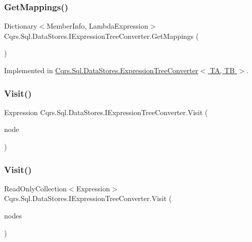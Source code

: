 \subsubsection{\texorpdfstring{Get\+Mappings()}{GetMappings()}}
{\footnotesize\ttfamily Dictionary$<$Member\+Info, Lambda\+Expression$>$ Cqrs.\+Sql.\+Data\+Stores.\+I\+Expression\+Tree\+Converter.\+Get\+Mappings (\begin{DoxyParamCaption}{ }\end{DoxyParamCaption})}



Implemented in \hyperlink{classCqrs_1_1Sql_1_1DataStores_1_1ExpressionTreeConverter_abd0d906a5b8abd8520874104d3bfcad0}{Cqrs.\+Sql.\+Data\+Stores.\+Expression\+Tree\+Converter$<$ T\+A, T\+B $>$}.

\mbox{\label{interfaceCqrs_1_1Sql_1_1DataStores_1_1IExpressionTreeConverter_ae5904ce74f9184703c51b58840770172}} 
\subsubsection{\texorpdfstring{Visit()}{Visit()}\hspace{0.1cm}{\footnotesize\ttfamily [1/2]}}
{\footnotesize\ttfamily Expression Cqrs.\+Sql.\+Data\+Stores.\+I\+Expression\+Tree\+Converter.\+Visit (\begin{DoxyParamCaption}\item[{Expression}]{node }\end{DoxyParamCaption})}

\mbox{\label{interfaceCqrs_1_1Sql_1_1DataStores_1_1IExpressionTreeConverter_a24431bb6665d6d9b617f244049190655}} 
\subsubsection{\texorpdfstring{Visit()}{Visit()}\hspace{0.1cm}{\footnotesize\ttfamily [2/2]}}
{\footnotesize\ttfamily Read\+Only\+Collection$<$Expression$>$ Cqrs.\+Sql.\+Data\+Stores.\+I\+Expression\+Tree\+Converter.\+Visit (\begin{DoxyParamCaption}\item[{Read\+Only\+Collection$<$ Expression $>$}]{nodes }\end{DoxyParamCaption})}

